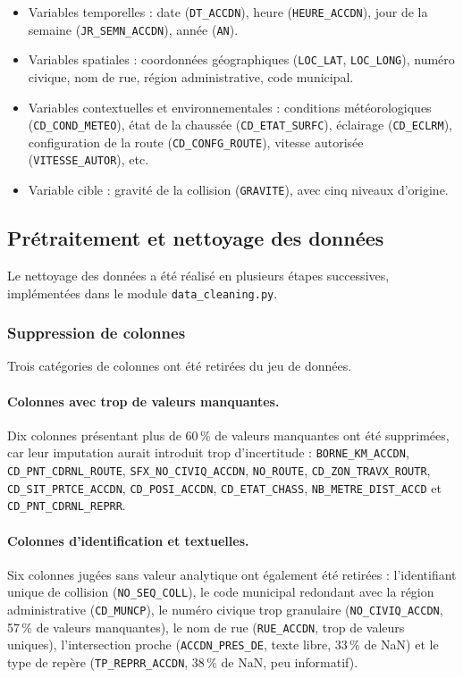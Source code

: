 \documentclass[11pt]{article}
\begin{document}
\begin{itemize}
  \item {Variables temporelles :} date (\texttt{DT\_ACCDN}),
        heure (\texttt{HEURE\_ACCDN}), jour de la semaine
        (\texttt{JR\_SEMN\_ACCDN}), année (\texttt{AN}).
  \item {Variables spatiales :} coordonnées géographiques
        (\texttt{LOC\_LAT}, \texttt{LOC\_LONG}), numéro civique,
        nom de rue, région administrative, code municipal.
  \item {Variables contextuelles et environnementales :}
        conditions météorologiques (\texttt{CD\_COND\_METEO}),
        état de la chaussée (\texttt{CD\_ETAT\_SURFC}),
        éclairage (\texttt{CD\_ECLRM}),
        configuration de la route (\texttt{CD\_CONFG\_ROUTE}),
        vitesse autorisée (\texttt{VITESSE\_AUTOR}), etc.
  \item {Variable cible :} gravité de la collision
        (\texttt{GRAVITE}), avec cinq niveaux d'origine.
\end{itemize}
 
\subsection{Prétraitement et nettoyage des données}
\label{preprocess}
 
Le nettoyage des données a été réalisé en plusieurs étapes successives,
implémentées dans le module \texttt{data\_cleaning.py}.
 
\subsubsection{Suppression de colonnes}
 
Trois catégories de colonnes ont été retirées du jeu de données.
 
\paragraph{Colonnes avec trop de valeurs manquantes.}
Dix colonnes présentant plus de 60\,\% de valeurs manquantes ont été
supprimées, car leur imputation aurait introduit trop d'incertitude :
\texttt{BORNE\_KM\_ACCDN}, \texttt{CD\_PNT\_CDRNL\_ROUTE},
\texttt{SFX\_NO\_CIVIQ\_ACCDN}, \texttt{NO\_ROUTE},
\texttt{CD\_ZON\_TRAVX\_ROUTR}, \texttt{CD\_SIT\_PRTCE\_ACCDN},
\texttt{CD\_POSI\_ACCDN}, \texttt{CD\_ETAT\_CHASS},
\texttt{NB\_METRE\_DIST\_ACCD} et \texttt{CD\_PNT\_CDRNL\_REPRR}.
 
\paragraph{Colonnes d'identification et textuelles.}
Six colonnes jugées sans valeur analytique ont également été retirées :
l'identifiant unique de collision (\texttt{NO\_SEQ\_COLL}),
le code municipal redondant avec la région administrative
(\texttt{CD\_MUNCP}), le numéro civique trop granulaire
(\texttt{NO\_CIVIQ\_ACCDN}, 57\,\% de valeurs manquantes),
le nom de rue (\texttt{RUE\_ACCDN}, trop de valeurs uniques),
l'intersection proche (\texttt{ACCDN\_PRES\_DE}, texte libre,
33\,\% de NaN) et le type de repère (\texttt{TP\_REPRR\_ACCDN},
38\,\% de NaN, peu informatif).
 
\end{document}

